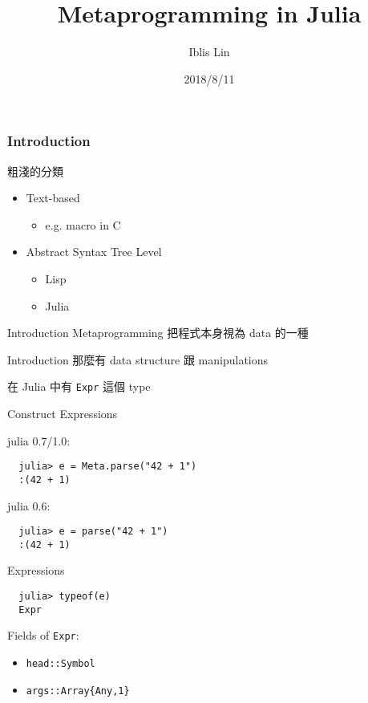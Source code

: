 \documentclass[14pt]{beamer}
\title{Metaprogramming in Julia}
\author{Iblis Lin}
\institute{}
\date{2018/8/11}
\begin{document}
\frame{\titlepage}

\begin{frame}
\frametitle{Introduction}
  粗淺的分類
  \begin{itemize}
    \item Text-based
      \begin{itemize}
        \item e.g. macro in C
      \end{itemize}
    \item Abstract Syntax Tree Level
      \begin{itemize}
        \item Lisp
        \item Julia
      \end{itemize}
  \end{itemize}
\end{frame}


\begin{frame}{Introduction}
  Metaprogramming 把程式本身視為 data 的一種
\end{frame}


\begin{frame}{Introduction}
  那麼有 data structure 跟 manipulations

  \pause
  在 Julia 中有 \alert{\texttt{Expr}} 這個 type
\end{frame}


\begin{frame}[fragile]{Construct Expressions}

julia 0.7/1.0:
\begin{lstlisting}
  julia> e = Meta.parse("42 + 1")
  :(42 + 1)
\end{lstlisting}

julia 0.6:
\begin{lstlisting}
  julia> e = parse("42 + 1")
  :(42 + 1)
\end{lstlisting}
\end{frame}


\begin{frame}[fragile]{Expressions}
\begin{lstlisting}
  julia> typeof(e)
  Expr
\end{lstlisting}

Fields of \texttt{Expr}:
\begin{itemize}
  \item \texttt{head::Symbol}
  \item \texttt{args::Array\{Any,1\}}
\end{itemize}

\end{frame}
\end{document}
